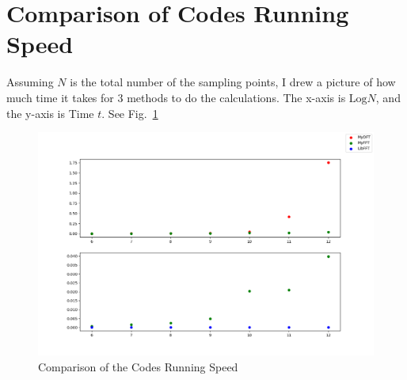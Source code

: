 \documentclass{article}
\begin{document}
\section{Comparison of Codes Running Speed}
Assuming $N$ is the total number of the sampling points, I drew a picture of how much time it takes for 3 methods to do the calculations. The x-axis is $\mathrm{Log}N$, and the y-axis is Time $t$. See Fig.~\ref{fig:speedtest}

\begin{figure}[!h]
    \centering
    \includegraphics[width=5 in]{../pic/speedtest.png}
    \caption{Comparison of the Codes Running Speed}
    \label{fig:speedtest}
\end{figure}




\end{document}
